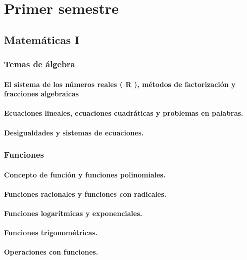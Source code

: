 \part{Primer semestre}
\chapter{Matemáticas I}


\section{Temas de álgebra} %

\subsection{El sistema de los números reales ( R ), métodos de factorización y fracciones algebraicas}
\subsection{Ecuaciones lineales, ecuaciones cuadráticas y problemas en palabras.}
\subsection{Desigualdades y sistemas de ecuaciones.}






\section{Funciones} %
\subsection{Concepto de función y funciones polinomiales.}
\subsection{Funciones racionales y funciones con radicales.}
\subsection{Funciones logarítmicas y exponenciales.}
\subsection{Funciones trigonométricas.}
\subsection{Operaciones con funciones.}






